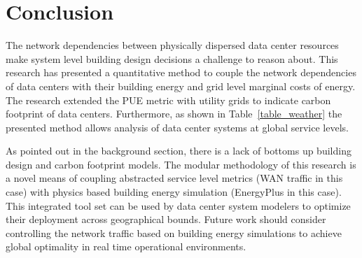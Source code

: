 \section{Conclusion}
The network dependencies between physically dispersed data center resources make system level building design decisions a challenge to reason about. This research has presented a quantitative method to couple the network dependencies of data centers with their building energy and grid level marginal costs of energy. The research extended the PUE metric with utility grids to indicate carbon footprint of data centers.  Furthermore, as shown in Table~\ref{table_weather} the presented method allows analysis of data center systems at global service levels.

As pointed out in the background section, there is a lack of bottoms up building design and carbon footprint models. The modular methodology of this research is a novel means of coupling abstracted service level metrics (WAN traffic in this case) with physics based building energy simulation (EnergyPlus in this case). This integrated tool set can be used by data center system modelers to optimize their deployment across geographical bounds. Future work should consider controlling the network traffic based on building energy simulations to achieve global optimality in real time operational environments.  


